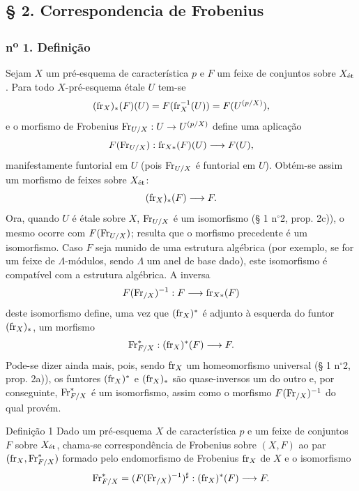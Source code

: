 \subsection*{§ 2. Correspondencia de Frobenius}

\subsubsection*{n\textsuperscript{o} 1. Definição}

Sejam $X$ um pré-esquema de característica $p$ e $F$ um feixe de conjuntos sobre $X_{\mathrm{\acute{e}t}}$. Para todo $X$-pré-esquema étale $U$ tem-se
\[
(\operatorname{fr}_X)_*(F)(U)=F(\operatorname{fr}_X^{-1}(U))=F(U^{(p/X)}),
\]
e o morfismo de Frobenius $\operatorname{Fr}_{U/X}:U\to U^{(p/X)}$ define uma aplicação
\[
F(\operatorname{Fr}_{U/X}):\operatorname{fr}_{X*}(F)(U)\longrightarrow F(U),
\]
manifestamente funtorial em $U$ (pois $\operatorname{Fr}_{U/X}$ é funtorial em $U$). Obtém-se assim um morfismo de feixes sobre $X_{\mathrm{\acute{e}t}}$:
\[
(\operatorname{fr}_X)_*(F)\longrightarrow F.
\]
Ora, quando $U$ é étale sobre $X$, $\operatorname{Fr}_{U/X}$ é um isomorfismo (§ 1 n$^\circ$2, prop. 2c)), o mesmo ocorre com $F(\operatorname{Fr}_{U/X})$; resulta que o morfismo precedente é um isomorfismo. Caso $F$ seja munido de uma estrutura algébrica (por exemplo, se for um feixe de $\Lambda$-módulos, sendo $\Lambda$ um anel de base dado), este isomorfismo é compatível com a estrutura algébrica. A inversa
\[
F(\operatorname{Fr}_{/X})^{-1}:F\longrightarrow \operatorname{fr}_{X*}(F)
\]
deste isomorfismo define, uma vez que $(\operatorname{fr}_X)^*$ é adjunto à esquerda do funtor $(\operatorname{fr}_X)_*$, um morfismo
\[
\operatorname{Fr}^*_{F/X}:(\operatorname{fr}_X)^*(F)\longrightarrow F.
\]
Pode-se dizer ainda mais, pois, sendo $\operatorname{fr}_X$ um homeomorfismo universal (§ 1 n$^\circ$2, prop. 2a)), os funtores $(\operatorname{fr}_X)^*$ e $(\operatorname{fr}_X)_*$ são quase-inversos um do outro e, por conseguinte, $\operatorname{Fr}^*_{F/X}$ é um isomorfismo, assim como o morfismo $F(\operatorname{Fr}_{/X})^{-1}$ do qual provém.

\begin{statement}{Definição 1}
Dado um pré-esquema $X$ de característica $p$ e um feixe de conjuntos $F$ sobre $X_{\mathrm{\acute{e}t}}$, chama-se correspondência de Frobenius sobre $(X,F)$ ao par $(\operatorname{fr}_X,\operatorname{Fr}^*_{F/X})$ formado pelo endomorfismo de Frobenius $\operatorname{fr}_X$ de $X$ e o isomorfismo
\[
\operatorname{Fr}^*_{F/X}=(F(\operatorname{Fr}_{/X})^{-1})^\sharp:(\operatorname{fr}_X)^*(F)\longrightarrow F.
\]
\end{statement}

